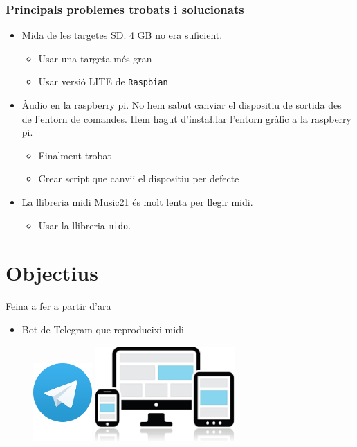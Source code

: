 \documentclass{beamer}
\begin{document}
\begin{frame}
	\frametitle{Principals problemes trobats i solucionats}
	\begin{itemize}[<+->]
		\item Mida de les targetes SD. 4 GB no era suficient.
		\begin{itemize}
			\item Usar una targeta més gran
			\item Usar versió LITE de \texttt{Raspbian}
		\end{itemize}
		\item Àudio en la raspberry pi. No hem sabut canviar el dispositiu de sortida des de l'entorn de comandes. Hem hagut d'insta\l.lar l'entorn gràfic a la raspberry pi.
		\begin{itemize}
			\item Finalment trobat
			\item Crear script que canvii el dispositiu per defecte
		\end{itemize}
		\item La llibreria midi Music21 és molt lenta per llegir midi.
		\begin{itemize}
			\item Usar la llibreria \texttt{mido}.
		\end{itemize}
	\end{itemize}
\end{frame}

\section{Objectius}
\begin{frame}{Feina a fer a partir d'ara}
	\begin{itemize}[<+->]
		\item Bot de Telegram que reprodueixi midi
	\end{itemize}
	\begin{figure}
		\hfill
		\includegraphics[width=0.2\textwidth]{images/telegram}
		\hfill
		\includegraphics[width=0.475\textwidth]{images/mobile}
		\hfill
	\end{figure}
\end{frame}
\end{document}
